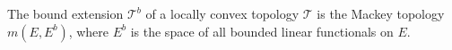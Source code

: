 The bound extension $\mathcal{T}^b$ of a locally convex topology $\mathcal{T}$ is the Mackey topology $m(E, E^b)$, where $E^b$ is the space of all bounded linear functionals on $E$.
